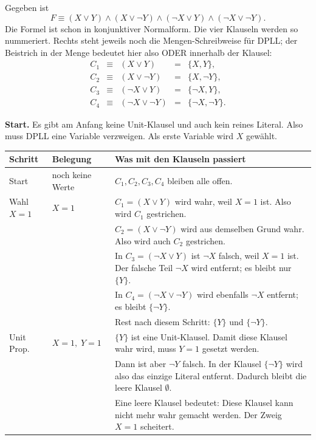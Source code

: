 \documentclass[a4paper,12pt]{article}
\begin{document}
\medskip
Gegeben ist
\[
F \equiv (X \vee Y) \wedge (X \vee \neg Y)
\wedge (\neg X \vee Y) \wedge (\neg X \vee \neg Y).
\]
Die Formel ist schon in konjunktiver Normalform. Die vier Klauseln
werden so nummeriert. Rechts steht jeweils noch die Mengen-Schreibweise
f\"ur DPLL; der Beistrich in der Menge bedeutet hier also ODER innerhalb
der Klausel:
\[
\begin{array}{rclcl}
C_1 &\equiv& (X \vee Y)        &=& \{X,Y\},\\
C_2 &\equiv& (X \vee \neg Y)   &=& \{X,\neg Y\},\\
C_3 &\equiv& (\neg X \vee Y)   &=& \{\neg X,Y\},\\
C_4 &\equiv& (\neg X \vee \neg Y) &=& \{\neg X,\neg Y\}.
\end{array}
\]

\medskip
\textbf{Start.}
Es gibt am Anfang keine Unit-Klausel und auch kein reines Literal.
Also muss DPLL eine Variable verzweigen. Als erste Variable wird $X$
gew\"ahlt.

\begin{center}
\small
\renewcommand{\arraystretch}{1.25}
\begin{tabular}{p{}p{}p{}}
\toprule
Schritt & Belegung & Was mit den Klauseln passiert \\
\midrule
Start
& noch keine Werte
& $C_1,C_2,C_3,C_4$ bleiben alle offen. \\
\midrule
Wahl $X=1$
& $X=1$
& $C_1=(X\vee Y)$ wird wahr, weil $X=1$ ist. Also wird $C_1$
  gestrichen.\\
&& $C_2=(X\vee\neg Y)$ wird aus demselben Grund wahr. Also wird auch
  $C_2$ gestrichen.\\
&& In $C_3=(\neg X\vee Y)$ ist $\neg X$ falsch, weil $X=1$ ist.
  Der falsche Teil $\neg X$ wird entfernt; es bleibt nur $\{Y\}$.\\
&& In $C_4=(\neg X\vee\neg Y)$ wird ebenfalls $\neg X$ entfernt;
  es bleibt $\{\neg Y\}$.\\
&& Rest nach diesem Schritt: $\{Y\}$ und $\{\neg Y\}$. \\
\midrule
Unit Prop.
& $X=1,\;Y=1$
& $\{Y\}$ ist eine Unit-Klausel. Damit diese Klausel wahr wird, muss
  $Y=1$ gesetzt werden.\\
&& Dann ist aber $\neg Y$ falsch. In der Klausel $\{\neg Y\}$ wird
  also das einzige Literal entfernt. Dadurch bleibt die leere Klausel
  $\emptyset$.\\
&& Eine leere Klausel bedeutet: Diese Klausel kann nicht mehr wahr
  gemacht werden. Der Zweig $X=1$ scheitert. \\
\bottomrule
\end{tabular}
\end{center}
\end{document}
